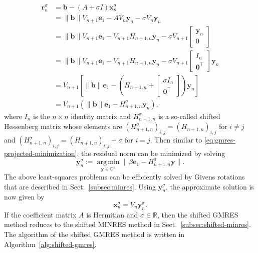 \[\begin{aligned}\bm r_n^{\sigma}&=\bm b-(A+\sigma I)\bm x_n^{\sigma}\\
&=\|\bm b\|V_{n+1}\bm e_1-AV_n\bm y_n-\sigma V_n\bm y_n\\
&=\|\bm b\|V_{n+1}\bm e_1-V_{n+1}H_{n+1,n}\bm y_n-\sigma V_{n+1}\begin{bmatrix}\bm y_n\\0\end{bmatrix}\\
&=\|\bm b\|V_{n+1}\bm e_1-V_{n+1}H_{n+1,n}\bm y_n-\sigma V_{n+1}\begin{bmatrix}I_n\\\bm0^{\top}\end{bmatrix}\bm y_n\\
&=V_{n+1}\left[\|\bm b\|\bm e_1-\left(H_{n+1,n}+\begin{bmatrix}\sigma I_n\\\bm0^{\top}\end{bmatrix}\right)\bm y_n\right]\\
&=V_{n+1}(\|\bm b\|\bm e_1-H_{n+1,n}^{\sigma}\bm y_n),\end{aligned}\]
{where $I_n$ is the $n\times n$ identity matrix and $H_{n+1,n}^{\sigma}$ is a so-called shifted Hessenberg matrix whose elements are $(H_{n+1,n}^{\sigma})_{i,j}=(H_{n+1,n})_{i,j}$ for $i\ne j$ and $(H_{n+1,n}^{\sigma})_{i,j}=(H_{n+1,n})_{i,j}+\sigma$ for $i=j$. Then similar to \eqref{eq:gmres-projected-minimization}, the residual norm can be minimized by solving}
\[\bm y_n^{\sigma}:=\operatorname*{arg\,min}_{\bm y\in\mathbb C^n}\|\beta\bm e_1-H_{n+1,n}^{\sigma}\bm y\|.\]
{The above least-squares problems can be efficiently solved by Givens rotations that are described in Sect.\ \ref{subsec:minres}. Using $\bm y_n^{\sigma}$, the approximate solution is now given by}
\[\bm x_n^{\sigma}=V_n\bm y_n^{\sigma}.\]
{If the coefficient matrix $A$ is Hermitian and $\sigma\in\mathbb R$, then the shifted GMRES method reduces to the shifted MINRES method in Sect.\ \ref{subsec:shifted-minres}. The algorithm of the shifted GMRES method is written in Algorithm\ \ref{alg:shifted-gmres}.}
